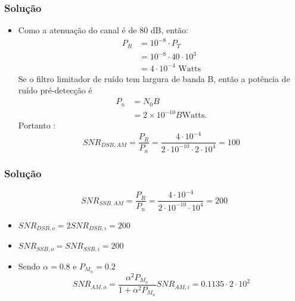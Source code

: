 \documentclass{beamer}
\begin{document}
\begin{frame}
  \frametitle{Solução}

  \begin{itemize}
    \item  Como a atenuação do canal é de 80 dB, então: 
    \begin{align*}
      P_R &= 10^{-8} \cdot P_T \\
        &= 10^{-8} \cdot 40 \cdot 10^3 \\
        & = 4 \cdot 10^{-4} \text{ Watts}
      \end{align*}
      Se o filtro limitador de ruído tem largura de banda B, então a potência de ruído pré-detecção é
      \begin{align*}
        P_n &= N_0 B  \\
        & = 2 \times 10^{-10} B \text{Watts}.
      \end{align*}
      Portanto  : 
      \begin{equation*}
        SNR_{DSB,AM} = \frac{P_R}{P_n} = \frac{4\cdot 10^{-4}}{2 \cdot 10^{-10} \cdot 2 \cdot 10^4} = 100
        \end{equation*}
  \end{itemize}

\end{frame}

\begin{frame}
  \frametitle{Solução}
  \begin{equation*}
    SNR_{SSB,AM} = \frac{P_R}{P_n} = \frac{4\cdot 10^{-4}}{2 \cdot 10^{-10} \cdot 10^4} = 200
    \end{equation*}
  \begin{itemize}
    \item $SNR_{DSB,o} = 2 SNR_{DSB,i} = 200 $
    \item $SNR_{SSB,o} = SNR_{SSB,i} = 200 $
    \item Sendo $\alpha = 0.8$ e $P_{M_n} = 0.2$ 
    \begin{equation}
      SNR_{AM,o} = \frac{\alpha^2 P_{M_n}}{1 + \alpha^2 P_{M_n}}SNR_{AM,i} = 0.1135 \cdot 2 \cdot 10^2
      \end{equation}
  \end{itemize}  

\end{frame}
\end{document}
